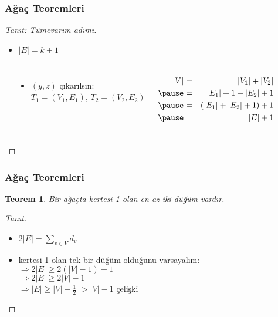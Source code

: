 \documentclass[dvipsnames]{beamer}
\theoremstyle{definition}
\theoremstyle{example}
\theoremstyle{plain}
\newtheorem{teorem}[theorem]{Teorem}
\begin{document}
\begin{frame}
  \frametitle{Ağaç Teoremleri}

  \begin{proof}[Tanıt: Tümevarım adımı]
    \begin{itemize}
      \item $|E|=k+1$
    \end{itemize}

    \begin{columns}[t]
      \begin{center}
      \end{center}

      \pause
      \begin{itemize}
        \item $(y,z)$ çıkarılsın:\\
          $T_1=(V_1,E_1)$, $T_2=(V_2,E_2)$
      \end{itemize}
      \pause
      \begin{eqnarray*}
        |V| & = & |V_1|+|V_2|\\\pause
            & = & |E_1|+1+|E_2|+1\\\pause
            & = & (|E_1|+|E_2|+1)+1\\\pause
            & = & |E|+1
      \end{eqnarray*}
    \end{columns}
  \end{proof}
\end{frame}

\begin{frame}
  \frametitle{Ağaç Teoremleri}

  \begin{teorem}
    Bir ağaçta kertesi 1 olan en az iki düğüm vardır.
  \end{teorem}

  \pause
  \begin{proof}[Tanıt]
    \begin{itemize}
      \item $2 |E| = \sum_{v \in V} d_v$

      \pause
      \item kertesi 1 olan tek bir düğüm olduğunu varsayalım:\\
        \pause
        $\Rightarrow 2 |E| \geq 2 (|V| - 1) + 1$\\
        \pause
        $\Rightarrow 2 |E| \geq 2 |V| - 1$\\
        \pause
        $\Rightarrow |E| \geq |V| - \frac{1}{2}$
        \pause
        $> |V| - 1$ \alert{çelişki}
    \end{itemize}
  \end{proof}
\end{frame}
\end{document}
